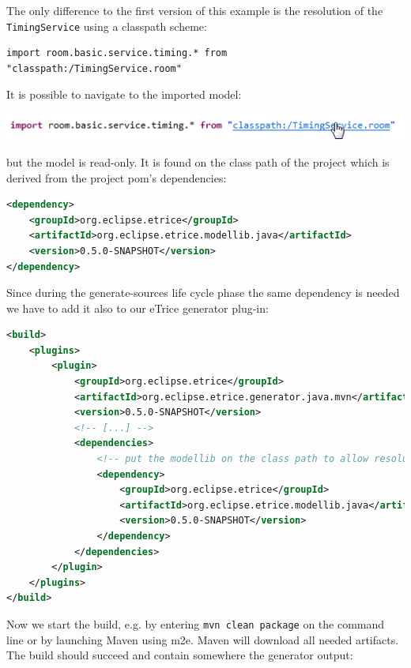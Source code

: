 The only difference to the first version of this example is the resolution of the \texttt{TimingService} using
a classpath scheme:

\begin{lstlisting}[language=ROOM]
import room.basic.service.timing.* from "classpath:/TimingService.room"
\end{lstlisting}

It is possible to navigate to the imported model:

\includegraphics{images/042-navigate-import.png}

but the model is read-only. It is found on the class path of the project which is derived from the project pom's dependencies:

\begin{lstlisting}[language=XML]
<dependency>
	<groupId>org.eclipse.etrice</groupId>
	<artifactId>org.eclipse.etrice.modellib.java</artifactId>
	<version>0.5.0-SNAPSHOT</version>
</dependency>
\end{lstlisting}

Since during the generate-sources life cycle phase the same dependency is needed we have to add it also to
our eTrice generator plug-in:

\begin{lstlisting}[language=XML]
<build>
	<plugins>
		<plugin>
			<groupId>org.eclipse.etrice</groupId>
			<artifactId>org.eclipse.etrice.generator.java.mvn</artifactId>
			<version>0.5.0-SNAPSHOT</version>
			<!-- [...] -->
			<dependencies>
				<!-- put the modellib on the class path to allow resolution of models by the generator -->
				<dependency>
					<groupId>org.eclipse.etrice</groupId>
					<artifactId>org.eclipse.etrice.modellib.java</artifactId>
					<version>0.5.0-SNAPSHOT</version>
				</dependency>
			</dependencies>
		</plugin>
	</plugins>
</build>
\end{lstlisting}

Now we start the build, e.g. by entering \texttt{mvn clean package} on the command line or by launching Maven
using m2e. Maven will download all needed artifacts. The build should succeed and contain somewhere the generator
output:

